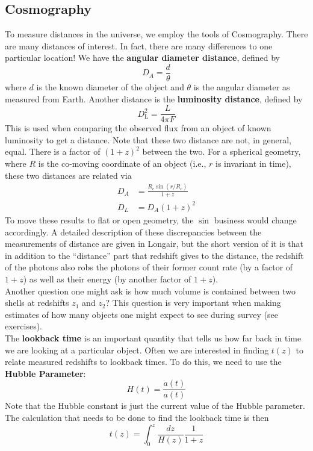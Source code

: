 \documentclass[10pt]{article}
\numberwithin{equation}{section}
\newcommand{\n}{\noindent}
\begin{document}
	\subsection{Cosmography} %
	\label{sub:cosmography}
		To measure distances in the universe, we employ the tools of Cosmography. There are many distances of interest. In fact, there are many differences to one particular location! We have the \textbf{angular diameter distance}, defined by
		\begin{equation}
			\label{eq:distances:1} D_A = \frac{d}{\theta}
		\end{equation}
		where $d$ is the known diameter of the object and $\theta$ is the angular diameter as measured from Earth. Another distance is the \textbf{luminosity distance}, defined by
		\begin{equation}
			\label{eq:distances:2} D_\mathrm{L}^2 = \frac{L}{4\pi F}
		\end{equation}
		This is used when comparing the observed flux from an object of known luminosity to get a distance. Note that these two distance are not, in general, equal. There is a factor of $(1+z)^2$ between the two. For a spherical geometry, where $R$ is the co-moving coordinate of an object (i.e., $r$ is invariant in time), these two distances are related via
		\begin{align}
			\label{eq:eq:distances:3} D_A &= \frac{R_c \sin(r/R_c)}{1+z}\\
			\label{eq:eq:distances:4} D_L &= D_A(1+z)^2
		\end{align}
		To move these results to flat or open geometry, the $\sin$ business would change accordingly. A detailed description of these discrepancies between the measurements of distance are given in Longair, but the short version of it is that in addition to the ``distance'' part that redshift gives to the distance, the redshift of the photons also robs the photons of their former count rate (by a factor of $1+z$) as well as their energy (by another factor of $1+z$).\\
	
		\n Another question one might ask is how much volume is contained between two shells at redshifts $z_1$ and $z_2$? This question is very important when making estimates of how many objects one might expect to see during survey (see exercises).\\
	
		\n The \textbf{lookback time} is an important quantity that tells us how far back in time we are looking at a particular object. Often we are interested in finding $t(z)$ to relate measured redshifts to lookback times. To do this, we need to use the \textbf{Hubble Parameter}:
		\begin{equation}
			\label{eq:distances:5} H(t) = \frac{\dot{a}(t)}{a(t)}
		\end{equation}
		Note that the Hubble constant is just the current value of the Hubble parameter. The calculation that needs to be done to find the lookback time is then
		\begin{equation}
			\label{eq:distances:6} t(z) = \int_0^z \frac{dz}{H(z)}\frac{1}{1+z}
		\end{equation}
	
\end{document}
